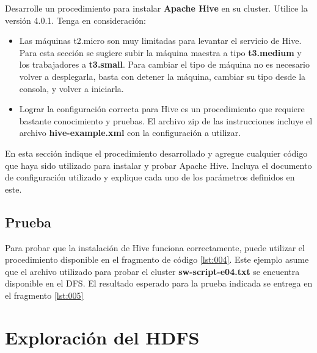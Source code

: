 \documentclass[12pt,letterpaper,twoside]{article}
\begin{document}
{\color{red} Desarrolle un procedimiento para instalar \textbf{Apache Hive} en su cluster. Utilice la versión 4.0.1. Tenga en consideración:
\begin{itemize}
    \item Las máquinas t2.micro son muy limitadas para levantar el servicio de Hive. Para esta sección se sugiere subir la máquina maestra a tipo \textbf{t3.medium} y los trabajadores a \textbf{t3.small}. Para cambiar el tipo de máquina no es necesario volver a desplegarla, basta con detener la máquina, cambiar su tipo desde la consola, y volver a iniciarla.
    \item Lograr la configuración correcta para Hive es un procedimiento que requiere bastante conocimiento y pruebas. El archivo zip de las instrucciones incluye el archivo \textbf{hive-example.xml} con la configuración a utilizar.
\end{itemize}}

{\color{red} En esta sección indique el procedimiento desarrollado y agregue cualquier código que haya sido utilizado para instalar y probar Apache Hive. Incluya el documento de configuración utilizado y explique cada uno de los parámetros definidos en este.}

\subsection{Prueba}

{\color{red} Para probar que la instalación de Hive funciona correctamente, puede utilizar el procedimiento disponible en el fragmento de código \ref{lst:004}. Este ejemplo asume que el archivo utilizado para probar el cluster \textbf{sw-script-e04.txt} se encuentra disponible en el DFS. El resultado esperado para la prueba indicada se entrega en el fragmento \ref{lst:005}}

\begin{code}[H]

\end{code}

\begin{code}[H]

\end{code}

\section{Exploración del HDFS}
\end{document}
